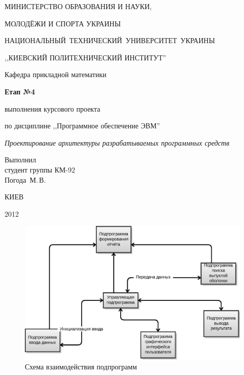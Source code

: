 \documentclass[a4paper,12pt,notitlepage,headsepline,pdftex]{scrartcl}
\begin{document}
\begin{titlepage}
  \begin{center}
    \large
    \MakeUppercase{Министерство образования и науки,}

    \MakeUppercase{молодёжи и спорта Украины}

    \mbox{\MakeUppercase{Национальный технический университет Украины}}

    \MakeUppercase{,,Киевский политехнический институт''}

    \addvspace{6pt}

    \normalsize
    Кафедра прикладной математики

    \vfill

    \textbf{Етап №4}

    выполнения курсового проекта

    по дисциплине ,,Программное обеспечение ЭВМ''

    \emph{Проектирование архитектуры разрабатываемых программных средств}
  \end{center}

  \vfill

  \noindent
  Выполнил\\
  студент группы КМ-92\\
  Погода~М.\,В.\\
  \vfill

  \begin{center}
    КИЕВ

    2012
  \end{center}
\end{titlepage}

\begin{figure}[h]
  \caption{Схема взаимодействия подпрограмм}
  \includegraphics{scheme.eps}
\end{figure}
\end{document}
